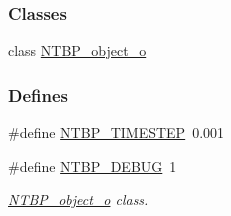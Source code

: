 \subsubsection*{Classes}
\begin{DoxyCompactItemize}
\item 
class \hyperlink{class_n_t_b_p__object__o}{NTBP\_\-object\_\-o}
\end{DoxyCompactItemize}
\subsubsection*{Defines}
\begin{DoxyCompactItemize}
\item 
\#define \hyperlink{ntbp__object__obj_8h_ae0149b425a551c08e03c985d790913ea}{NTBP\_\-TIMESTEP}~0.001
\item 
\#define \hyperlink{ntbp__object__obj_8h_a0f0435bc91cb273912b8ec7b3cd26a77}{NTBP\_\-DEBUG}~1
\begin{DoxyCompactList}\small\item\em \hyperlink{class_n_t_b_p__object__o}{NTBP\_\-object\_\-o} class. \item\end{DoxyCompactList}\end{DoxyCompactItemize}
